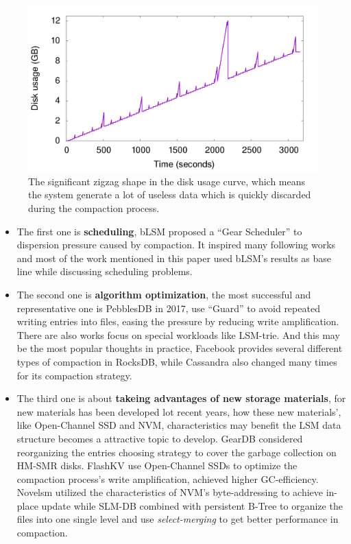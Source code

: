 \begin{figure}
	\centering
	\includegraphics[width=0.9\columnwidth]{fig/compaction-2}
	\caption{The significant zigzag shape in the disk usage curve, which means the system generate a lot of useless data which is quickly discarded during the compaction process.}
	\label{fig:disk_usage}
\end{figure}

\begin{itemize}
	\item The first one is \textbf{scheduling},  bLSM\cite{sears2012blsm} proposed a ``Gear Scheduler'' to dispersion pressure caused by compaction. It inspired many following works and most of the work mentioned in this paper used bLSM's results as base line while discussing scheduling problems. 
	\item 	The second one is \textbf{algorithm optimization}, the most successful and representative one is PebblesDB in 2017\cite{raju2017pebblesdb}, use ``Guard'' to avoid repeated writing entries into files, easing the pressure by reducing write amplification. There are also works focus on special workloads like LSM-trie\cite{wu2015lsm}. And this may be the most popular thoughts in practice, Facebook provides several different types of compaction in RocksDB\cite{Compacti60:online},\cite{dong2017optimizing} while Cassandra also changed many times for its compaction strategy\cite{Document20:online}.  
	\item The third one is about \textbf{takeing advantages of new storage materials}, for new materials has been developed lot recent years, how these new materials', like Open-Channel SSD\cite{bjorling2017lightnvm} and NVM, characteristics may benefit the LSM data structure becomes a attractive topic to develop. GearDB\cite{yao2019geardb} considered reorganizing the entries choosing strategy to cover the garbage collection on HM-SMR disks. FlashKV\cite{zhang2017flashkv} use Open-Channel SSDs to optimize the compaction process's write amplification, achieved higher GC-efficiency. Novelsm\cite{kannan2018redesigning} utilized the characteristics of NVM's byte-addressing to achieve in-place update while SLM-DB\cite{kaiyrakhmet2019slm} combined with persistent B-Tree to organize the files into one single level and use \textit{select-merging} to get better performance in compaction.
\end{itemize}

